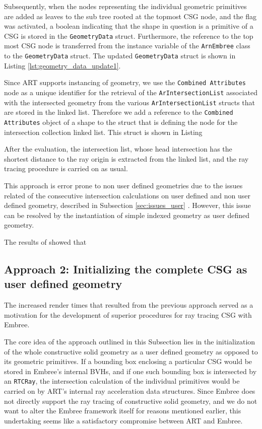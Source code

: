 Subsequently, when the nodes representing the individual geometric primitives are added as leaves to the sub tree rooted at the topmost CSG node, and the flag was activated, a boolean indicating that the shape in question is a primitive of a CSG is stored in the \texttt{GeometryData} struct. Furthermore, the reference to the top most CSG node is transferred from the instance variable of the \texttt{ArnEmbree} class to the \texttt{GeometryData} struct. The updated \texttt{GeometryData} struct is shown in Listing \ref{lst:geometry_data_update1}.


Since ART supports instancing of geometry, we use the \texttt{Combined Attributes} node as a unique identifier for the retrieval of the \texttt{ArIntersectionList} associated with the intersected geometry from the various \texttt{ArIntersectionList} structs that are stored in the linked list.
Therefore we add a reference to the \texttt{Combined Attributes} object of a shape to the struct that is defining the node for the intersection collection linked list. This struct is shown in Listing 

After the evaluation, the intersection list, whose head intersection has the shortest distance to the ray origin is extracted from the linked list, and the ray tracing procedure is carried on as usual.

This approach is error prone to non user defined geometries due to the issues related of the consecutive intersection calculations on user defined and non user defined geometry, described in Subsection \ref{sec:issues_user} . However, this issue can be resolved by the instantiation of simple indexed geometry as user defined geometry.

The results of \cite{karaffova2016} showed that


\subsection{Approach 2: Initializing the complete CSG as user defined geometry}

The increased render times that resulted from the previous approach served as a motivation for the development of superior procedures for ray tracing CSG with Embree. 

The core idea of the approach outlined in this Subsection lies in the initialization of the whole constructive solid geometry as a user defined geometry as opposed to its geometric primitives. If a bounding box enclosing a particular CSG would be stored in Embree's internal BVHs, and if one such bounding box is intersected by an \texttt{RTCRay}, the intersection calculation of the individual primitives would be carried on by ART's internal ray acceleration data structures. Since Embree does not directly support the ray tracing of constructive solid geometry, and we do not want to alter the Embree framework itself for reasons mentioned earlier, this undertaking seems like a satisfactory compromise between ART and Embree.

